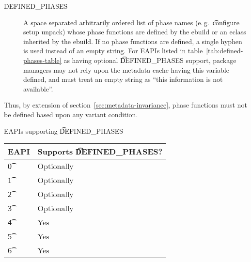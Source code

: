 \begin{description}
\item[DEFINED\_PHASES]  A space separated arbitrarily ordered list of
phase names (e.\,g.\ \t{configure setup unpack}) whose phase functions are defined by the ebuild or
an eclass inherited by the ebuild. If no phase functions are defined, a single hyphen is used
instead of an empty string. For EAPIs listed in table~\ref{tab:defined-phases-table} as having
optional \t{DEFINED\_PHASES} support, package managers may not rely upon the metadata cache having
this variable defined, and must treat an empty string as ``this information is not available''.
\end{description}

\note Thus, by extension of section~\ref{sec:metadata-invariance}, phase functions must not be defined
based upon any variant condition.

\begin{centertable}{EAPIs supporting \t{DEFINED\_PHASES}} \label{tab:defined-phases-table}
    \begin{tabular}{ l l }
        \toprule
        \multicolumn{1}{c}{\textbf{EAPI}} &
        \multicolumn{1}{c}{\textbf{Supports \t{DEFINED\_PHASES}?}} \\
        \midrule
    \t{0} & Optionally \\
    \t{1} & Optionally \\
    \t{2} & Optionally \\
    \t{3} & Optionally \\
    \t{4} & Yes \\
    \t{5} & Yes \\
    \t{6} & Yes \\
    \bottomrule
    \end{tabular}
\end{centertable}


